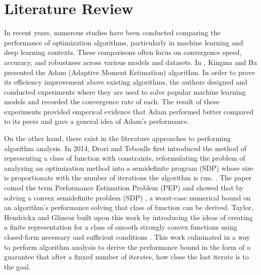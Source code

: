 \chapter{Literature Review}\label{chapter:literature}

In recent years, numerous studies have been conducted comparing the performance of optimization algorithms, particularly in machine learning and deep learning contexts. These comparisons often focus on convergence speed, accuracy, and robustness across various models and datasets. In \cite{adam}, Kingma and Ba presented the Adam (Adaptive Moment Estimation) algorithm. In order to prove its efficiency improvement above existing algorithms, the authors designed and conducted experiments where they are used to solve popular machine learning models and recorded the convergence rate of each. The result of these experiments provided emperical evidence that Adam performed better compared to its peers and gave a general idea of Adam's performance.


On the other hand, there exist in the literature approaches to performing algorithm analysis. In 2014, Drori and Teboulle first introduced the method of representing a class of function with constraints, reformulating the problem of analyzing an optimization method into a semidefinite program (SDP) whose size is proportionate with the number of iterations the algorithm is run. \cite{drori2012} . The paper coined the term Performance Estimation Problem (PEP) and showed that by solving a convex semidefinite problem (SDP) , a worst-case numerical bound on an algorithm's performance solving that class of function can be derived. Taylor, Hendrickx and Glineur built upon this work by introducing the ideas of creating a finite representation for a class of smooth strongly convex functions using closed-form necessary and sufficient conditions . This work culminated in a way to perform algorithm analysis to derive the performance bound in the form of a guarantee that after a finxed  number of iterates, how close the last iterate is to the goal.

